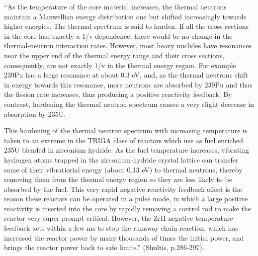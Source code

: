 \documentclass{school-22.211-notes}
\begin{document}
``As the temperature of the core material increases, the thermal neutrons maintain a Maxwellian energy distribution one but shifted increasingly towards higher energies. The thermal spectrum is said to harden. If all the cross sections in the core
had exactly a 1/v dependence, there would be no change in the thermal-neutron
interaction rates. However, most heavy nuclides have resonances near the upper end
of the thermal energy range and their cross sections, consequently, are not exactly
1/v in the thermal energy region. For example 239Pu has a large resonance at about 0.3 eV, and, as the thermal neutrons shift in energy towards this resonance, more neutrons are absorbed by 239Pu and thus the fission rate increases, thus producing a positive reactivity feedback. By contrast, hardening the thermal neutron spectrum causes a very slight decrease in absorption by 235U. 

This hardening of the thermal neutron spectrum with increasing temperature
is taken to an extreme in the TRIGA class of reactors which use as fuel enriched 235U blended in zirconium hydride. As the fuel temperature increases, vibrating hydrogen atoms trapped in the zirconium-hydride crystal lattice can transfer some
of their vibratiorial energy (about 0.13 eV) to thermal neutrons, thereby removing
them from the thermal energy region so they are less likely to be absorbed by the
fuel. This very rapid negative reactivity feedback effect is the reason these reactors
can be operated in a pulse mode, in which a large positive reactivity is inserted into
the core by rapidly removing a control rod to make the reactor very super prompt
critical. However, the ZrH negative temperature feedback acts within a few ms to
stop the runaway chain reaction, which has increased the reactor power by many
thousands of times the initial power, and brings the reactor power back to safe
limits.'' (Shultis, p.286-297). 
\end{document}
